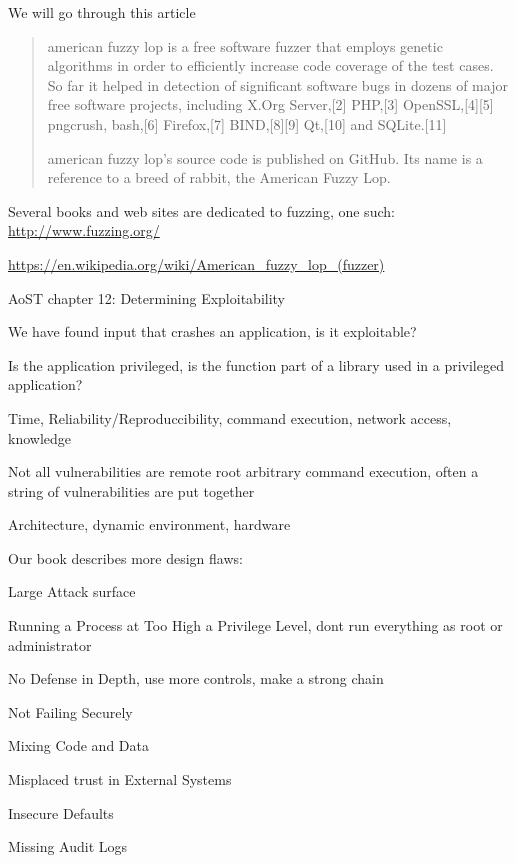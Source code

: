\documentclass[Screen16to9,17pt]{foils}
\begin{document}
We will go through this article





\begin{quote}
american fuzzy lop is a free software fuzzer that employs genetic algorithms in order to efficiently increase code coverage of the test cases. So far it helped in detection of significant software bugs in dozens of major free software projects, including X.Org Server,[2] PHP,[3] OpenSSL,[4][5] pngcrush, bash,[6] Firefox,[7] BIND,[8][9] Qt,[10] and SQLite.[11]

american fuzzy lop's source code is published on GitHub. Its name is a reference to a breed of rabbit, the American Fuzzy Lop.
\end{quote}

\begin{list2}
\item Several books and web sites are dedicated to fuzzing, one such:\\ \url{http://www.fuzzing.org/}
\item \url{https://en.wikipedia.org/wiki/American_fuzzy_lop_(fuzzer)}
\end{list2}





\begin{list2}
\item AoST chapter 12: Determining Exploitability
\item We have found input that crashes an application, is it exploitable?
\item Is the application privileged, is the function part of a library used in a privileged application?
\item Time, Reliability/Reproduccibility, command execution, network access, knowledge
\item Not all vulnerabilities are remote root arbitrary command execution, often a string of vulnerabilities are put together
\item Architecture, dynamic environment, hardware
\end{list2}


Our book describes more design flaws:
\begin{list2}
\item Large Attack surface
\item Running a Process at Too High a Privilege Level, dont run everything as root or administrator
\item No Defense in Depth, use more controls, make a strong chain
\item Not Failing Securely
\item Mixing Code and Data
\item Misplaced trust in External Systems
\item Insecure Defaults
\item Missing Audit Logs
\end{list2}
\end{document}
